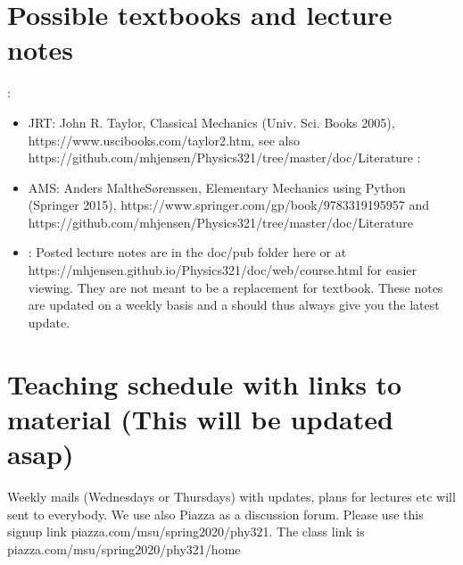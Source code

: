 \documentclass[letterpaper,10pt,english]{sphinxmanual}
\begin{document}
\chapter{Possible textbooks and lecture notes}
\label{\detokenize{intro:possible-textbooks-and-lecture-notes}}
:
\begin{itemize}
\item {} 
JRT: John R. Taylor, Classical Mechanics (Univ. Sci. Books 2005), https://www.uscibooks.com/taylor2.htm, see also https://github.com/mhjensen/Physics321/tree/master/doc/Literature
:

\item {} 
AMS: Anders Malthe\sphinxhyphen{}Sørenssen, Elementary Mechanics using Python (Springer 2015), https://www.springer.com/gp/book/9783319195957 and https://github.com/mhjensen/Physics321/tree/master/doc/Literature

\item {} 
: Posted lecture notes are in the doc/pub folder here or at https://mhjensen.github.io/Physics321/doc/web/course.html for easier viewing. They are not meant to be a replacement for textbook. These notes are updated on a weekly basis and a  should thus always give you the latest update.

\end{itemize}


\chapter{Teaching schedule with links to material (This will be updated asap)}
\label{\detokenize{intro:teaching-schedule-with-links-to-material-this-will-be-updated-asap}}
Weekly mails (Wednesdays or Thursdays) with updates, plans for lectures etc will sent to everybody. We use also Piazza as a discussion forum. Please use this sign\sphinxhyphen{}up link piazza.com/msu/spring2020/phy321. The class link is piazza.com/msu/spring2020/phy321/home
\end{document}
